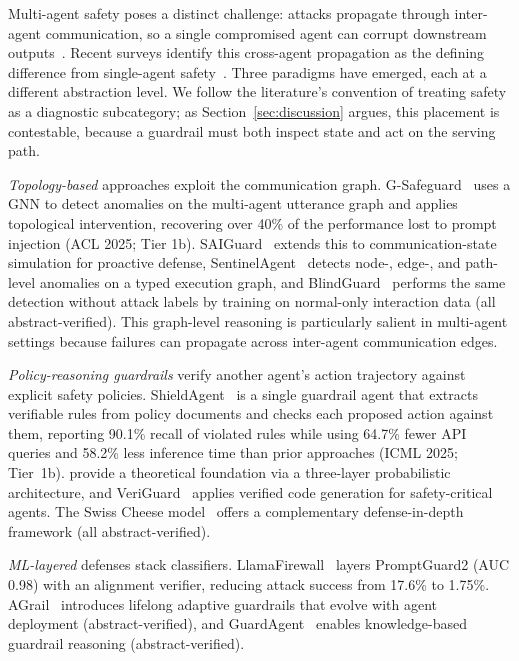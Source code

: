 Multi-agent safety poses a distinct challenge: attacks propagate through inter-agent communication, so a single compromised agent can corrupt downstream outputs~\cite{safellmagentsurvey2026, trustworthyagents2025}. Recent surveys identify this cross-agent propagation as the defining difference from single-agent safety~\cite{fullstacksafety2025}. Three paradigms have emerged, each at a different abstraction level. We follow the literature's convention of treating safety as a diagnostic subcategory; as Section~\ref{sec:discussion} argues, this placement is contestable, because a guardrail must both inspect state and act on the serving path.

\emph{Topology-based} approaches exploit the communication graph. G-Safeguard~\cite{gsafeguard2025} uses a GNN to detect anomalies on the multi-agent utterance graph and applies topological intervention, recovering over 40\% of the performance lost to prompt injection (ACL 2025; Tier 1b). SAIGuard~\cite{saiguard2026} extends this to communication-state simulation for proactive defense, SentinelAgent~\cite{sentinelagent2025} detects node-, edge-, and path-level anomalies on a typed execution graph, and BlindGuard~\cite{blindguard2025} performs the same detection without attack labels by training on normal-only interaction data (all abstract-verified). This graph-level reasoning is particularly salient in multi-agent settings because failures can propagate across inter-agent communication edges.

\emph{Policy-reasoning guardrails} verify another agent's action trajectory against explicit safety policies. ShieldAgent~\cite{shieldagent2025} is a single guardrail agent that extracts verifiable rules from policy documents and checks each proposed action against them, reporting 90.1\% recall of violated rules while using 64.7\% fewer API queries and 58.2\% less inference time than prior approaches (ICML 2025; Tier~1b). \cite{probabilisticarchitecture2026} provide a theoretical foundation via a three-layer probabilistic architecture, and VeriGuard~\cite{veriguard2025} applies verified code generation for safety-critical agents. The Swiss Cheese model~\cite{swisscheese2025} offers a complementary defense-in-depth framework (all abstract-verified).

\emph{ML-layered} defenses stack classifiers. LlamaFirewall~\cite{llamafirewall2025} layers PromptGuard2 (AUC 0.98) with an alignment verifier, reducing attack success from 17.6\% to 1.75\%. AGrail~\cite{agrail2025} introduces lifelong adaptive guardrails that evolve with agent deployment (abstract-verified), and GuardAgent~\cite{guardagent2024} enables knowledge-based guardrail reasoning (abstract-verified).

